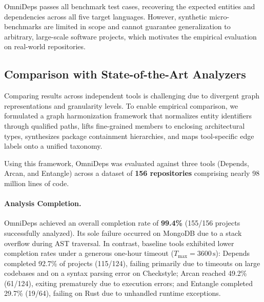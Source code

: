 \documentclass[a4paper, 11pt]{article}
\begin{document}
OmniDeps passes all benchmark test cases, recovering the expected
entities and dependencies across all five target languages. However,
synthetic micro-benchmarks are limited in scope and cannot guarantee
generalization to arbitrary, large-scale software projects, which
motivates the empirical evaluation on real-world repositories.

\subsection{Comparison with State-of-the-Art Analyzers}
Comparing results across independent tools is
challenging due to divergent graph representations and granularity
levels. To enable empirical comparison, we formulated a graph
harmonization framework that normalizes entity identifiers through
qualified paths, lifts fine-grained members to enclosing
architectural types, synthesizes package containment hierarchies, and
maps tool-specific edge labels onto a unified taxonomy.

Using this framework, OmniDeps was evaluated against three tools
(Depends, Arcan, and Entangle) across a dataset of \textbf{156
repositories} comprising nearly 98 million lines of code.

\paragraph{Analysis Completion.}
OmniDeps achieved an overall completion rate of \textbf{99.4\%}
(155/156 projects successfully analyzed). Its sole failure occurred
on MongoDB due to a stack overflow during AST traversal. In contrast,
baseline tools exhibited lower completion rates under a generous
one-hour timeout ($T_{\max} = 3600\,\text{s}$): Depends completed
92.7\% of projects (115/124), failing primarily due to timeouts on
large codebases and on a syntax parsing error on Checkstyle; Arcan
reached 49.2\% (61/124), exiting prematurely due to execution errors;
and Entangle completed 29.7\% (19/64), failing on Rust due to
unhandled runtime exceptions.
\end{document}
